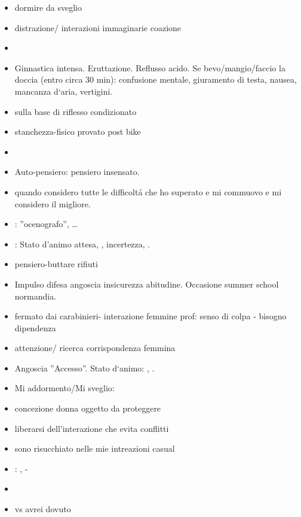 \begin{itemize}
\item dormire da sveglio
\item distrazione/ interazioni immaginarie coazione
\item {}
\item Ginnastica intensa. Eruttazione. Reflusso acido.
Se bevo/mangio/faccio la doccia (entro circa 30 min): confusione mentale, giuramento di testa, nausea, mancanza d‘aria, vertigini.
\item {} sulla base di riflesso condizionato
\item stanchezza-fisico provato post bike
\item {}
\item Auto-pensiero: pensiero insensato.
\item {} quando considero tutte le difficolt\'a che ho superato e mi commuovo e mi considero il migliore. 
\item {}: ''ocenografo'', \ldots
\item {}: Stato d'animo attesa, , incertezza, .
\item pensiero-buttare rifiuti
\item Impulso difesa angoscia insicurezza abitudine.
Occasione summer school normandia.
\item fermato dai carabinieri- interazione femmine prof: senso di colpa - bisogno dipendenza
\item attenzione/ ricerca corrispondenza femmina
\item Angoscia ''Accesso''. Stato d‘animo: , .
\item Mi addormento/Mi sveglio: 
\item concezione donna oggetto da proteggere
\item liberarsi dell'interazione che evita conflitti
\item sono risucchiato nelle mie intreazioni casual
\item {}: , -
\item {}
\item {} vs  avrei dovuto

\end{itemize}
